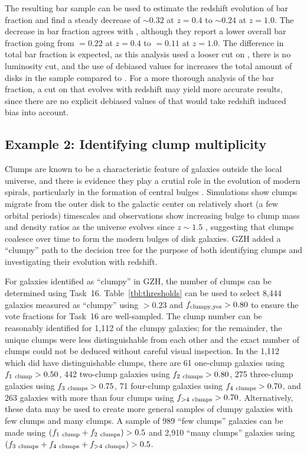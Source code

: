 \documentclass[twocolumn]{aastex6}
\begin{document}
The resulting bar sample can be used to estimate the redshift evolution of bar fraction and find a steady decrease of \fbar$\sim 0.32$ at $z=0.4$ to \fbar$\sim 0.24$ at $z=1.0$. The decrease in bar fraction agrees with \citet{mel14}, although they report a lower overall bar fraction going from \fbar$=0.22$ at $z=0.4$ to \fbar$=0.11$ at $z=1.0$. The difference in total bar fraction is expected, as this analysis used a looser cut on \fbar, there is no luminosity cut, and the use of debiased values for \ffeatures{} increases the total amount of disks in the sample compared to \citet{mel14}. For a more thorough analysis of the bar fraction, a cut on \fbar{} that evolves with redshift may yield more accurate results, since there are no explicit debiased values of \fbar{} that would take redshift induced bias into account. 

\subsection{Example 2: Identifying clump multiplicity}
Clumps are known to be a characteristic feature of galaxies outside the local universe, and there is evidence they play a crutial role in the evolution of modern spirals, particularly in the formation of central bulges \citep{elm05,elm14,guo15,beh16}. Simulations show clumps migrate from the outer disk to the galactic center on relatively short (a few orbital periods) timescales \citep{man15} and observations show increasing bulge to clump mass and density ratios as the universe evolves since $z\sim 1.5$ \citep{elm09}, suggesting that clumps coalesce over time to form the modern bulges of disk galaxies. GZH added a ``clumpy'' path to the decision tree for the purpose of both identifying clumps and investigating their evolution with redshift. 

For galaxies identified as ``clumpy'' in GZH, the number of clumps can be determined using Task~16. Table~\ref{tbl:thresholds} can be used to select 8,444 galaxies measured as ``clumpy'' using \ffeatures$> 0.23$ and $f_{\rm clumpy,yes}>0.80$ to ensure the vote fractions for Task~16 are well-sampled. The clump number can be reasonably identified for 1,112 of the clumpy galaxies; for the remainder, the unique clumps were less distinguishable from each other and the exact number of clumps could not be deduced without careful visual inspection. In the 1,112 which did have distinguishable clumps, there are 61 one-clump galaxies using $f_{\rm 1~clump}>0.50$, 442 two-clump galaxies using $f_{\rm 2~clumps}>0.80$, 275 three-clump galaxies using $f_{\rm 3~clumps}>0.75$, 71 four-clump galaxies using $f_{\rm 4~clumps} > 0.70$, and 263 galaxies with more than four clumps using $f_{\rm >4~clumps}>0.70$. Alternatively, these data may be used to create more general samples of clumpy galaxies with few clumps and many clumps. A sample of 989 ``few clumps'' galaxies can be made using $(f_{\rm 1~clump} + f_{\rm 2~clumps}) > 0.5$ and 2,910 ``many clumps'' galaxies using $(f_{\rm 3~clumps}+f_{\rm 4~clumps}+f_{\rm >4~clumps})>0.5$.
\end{document}

